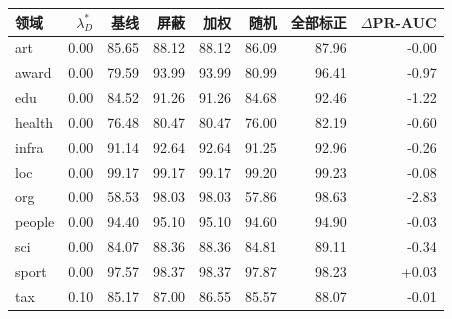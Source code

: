 \begin{tabular}{lrrrrrrr}
\toprule
领域 & $\lambda_D^*$ & 基线 & 屏蔽 & 加权 & 随机 & 全部标正 & $\Delta$PR-AUC \\
\midrule
art & 0.00 & 85.65 & 88.12 & 88.12 & 86.09 & 87.96 & -0.00 \\
award & 0.00 & 79.59 & 93.99 & 93.99 & 80.99 & 96.41 & -0.97 \\
edu & 0.00 & 84.52 & 91.26 & 91.26 & 84.68 & 92.46 & -1.22 \\
health & 0.00 & 76.48 & 80.47 & 80.47 & 76.00 & 82.19 & -0.60 \\
infra & 0.00 & 91.14 & 92.64 & 92.64 & 91.25 & 92.96 & -0.26 \\
loc & 0.00 & 99.17 & 99.17 & 99.17 & 99.20 & 99.23 & -0.08 \\
org & 0.00 & 58.53 & 98.03 & 98.03 & 57.86 & 98.63 & -2.83 \\
people & 0.00 & 94.40 & 95.10 & 95.10 & 94.60 & 94.90 & -0.03 \\
sci & 0.00 & 84.07 & 88.36 & 88.36 & 84.81 & 89.11 & -0.34 \\
sport & 0.00 & 97.57 & 98.37 & 98.37 & 97.87 & 98.23 & +0.03 \\
tax & 0.10 & 85.17 & 87.00 & 86.55 & 85.57 & 88.07 & -0.01 \\
\bottomrule
\end{tabular}
